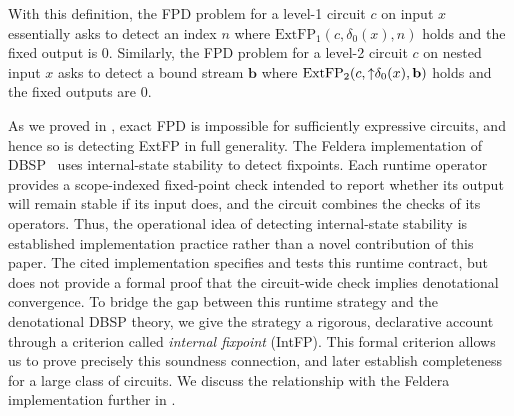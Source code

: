 With this definition, the FPD problem for a level-1 circuit $c$ on input $x$ essentially asks to detect an index $n$ where $\text{ExtFP}_1(c, \delta_0(x), n)$ holds and the fixed output is $0$. Similarly, the FPD problem for a level-2 circuit $c$ on nested input $x$ asks to detect a bound stream $\mathbf{b}$ where $\text{ExtFP}_2(c, {\uparrow}\delta_0(x), \mathbf{b})$ holds and the fixed outputs are $0$.

As we proved in , exact FPD is impossible for sufficiently expressive circuits, and hence so is detecting ExtFP in full generality.
The Feldera implementation of DBSP~\cite{feldera_repo} uses internal-state stability to detect fixpoints. Each runtime operator provides a scope-indexed fixed-point check intended to report whether its output will remain stable if its input does, and the circuit combines the checks of its operators. Thus, the operational idea of detecting internal-state stability is established implementation practice rather than a novel contribution of this paper. The cited implementation specifies and tests this runtime contract, but does not provide a formal proof that the circuit-wide check implies denotational convergence.
To bridge the gap between this runtime strategy and the denotational DBSP theory, we give the strategy a rigorous, declarative account through a criterion called \emph{internal fixpoint} (IntFP). This formal criterion allows us to prove precisely this soundness connection, and later establish completeness for a large class of circuits. We discuss the relationship with the Feldera implementation further in .

